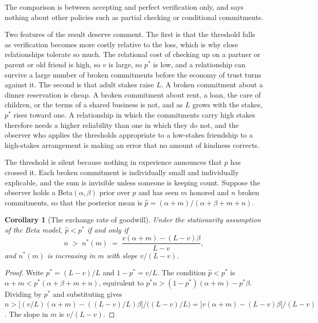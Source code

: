 \documentclass[11pt]{article}
\newtheorem{corollary}{Corollary}
\theoremstyle{definition}
\theoremstyle{remark}
\begin{document}
The comparison is between accepting and perfect verification only, and says nothing about other policies such as partial checking or conditional commitments.

Two features of the result deserve comment. The first is that the threshold falls as verification becomes more costly relative to the loss, which is why close relationships tolerate so much. The relational cost of checking up on a partner or parent or old friend is high, so $v$ is large, so $p^{*}$ is low, and a relationship can survive a large number of broken commitments before the economy of trust turns against it. The second is that adult stakes raise $L$. A broken commitment about a dinner reservation is cheap. A broken commitment about rent, a loan, the care of children, or the terms of a shared business is not, and as $L$ grows with the stakes, $p^{*}$ rises toward one. A relationship in which the commitments carry high stakes therefore needs a higher reliability than one in which they do not, and the observer who applies the thresholds appropriate to a low-stakes friendship to a high-stakes arrangement is making an error that no amount of kindness corrects.

The threshold is silent because nothing in experience announces that $p$ has crossed it. Each broken commitment is individually small and individually explicable, and the sum is invisible unless someone is keeping count. Suppose the observer holds a Beta$(\alpha,\beta)$ prior over $p$ and has seen $m$ honored and $n$ broken commitments, so that the posterior mean is $\hat p=(\alpha+m)/(\alpha+\beta+m+n)$.

\begin{corollary}[The exchange rate of goodwill]\label{cor:exchange}
Under the stationarity assumption of the Beta model, $\hat p<p^{*}$ if and only if
\[
n\;>\;n^{*}(m)\;=\;\frac{v(\alpha+m)-(L-v)\beta}{L-v},
\]
and $n^{*}(m)$ is increasing in $m$ with slope $v/(L-v)$.
\end{corollary}

\begin{proof}
Write $p^{*}=(L-v)/L$ and $1-p^{*}=v/L$. The condition $\hat p<p^{*}$ is $\alpha+m<p^{*}(\alpha+\beta+m+n)$, equivalent to $p^{*}n>(1-p^{*})(\alpha+m)-p^{*}\beta$. Dividing by $p^{*}$ and substituting gives $n>\bigl[(v/L)(\alpha+m)-((L-v)/L)\beta\bigr]\big/\bigl((L-v)/L\bigr)=\bigl[v(\alpha+m)-(L-v)\beta\bigr]/(L-v)$. The slope in $m$ is $v/(L-v)$.
\end{proof}
\end{document}
